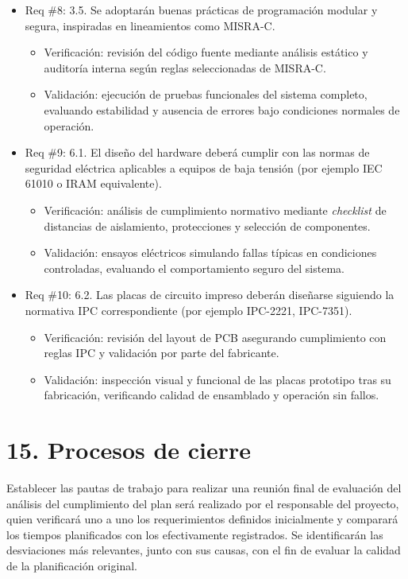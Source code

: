 \documentclass[
11pt, %
]{charter}
\begin{document}
\begin{itemize}
	\item Req \#8: 3.5. Se adoptarán buenas prácticas de programación modular y segura, inspiradas en lineamientos como MISRA-C.
	\begin{itemize}
		\item Verificación: revisión del código fuente mediante análisis estático y auditoría interna según reglas seleccionadas de MISRA-C.
		\item Validación: ejecución de pruebas funcionales del sistema completo, evaluando estabilidad y ausencia de errores bajo condiciones normales de operación.
	\end{itemize}
	
	\item Req \#9: 6.1. El diseño del hardware deberá cumplir con las normas de seguridad eléctrica aplicables a equipos de baja tensión (por ejemplo IEC 61010 o IRAM equivalente).
	\begin{itemize}
		\item Verificación: análisis de cumplimiento normativo mediante \textit{checklist} de distancias de aislamiento, protecciones y selección de componentes.
		\item Validación: ensayos eléctricos simulando fallas típicas en condiciones controladas, evaluando el comportamiento seguro del sistema.
	\end{itemize}
	
	\item Req \#10: 6.2. Las placas de circuito impreso deberán diseñarse siguiendo la normativa IPC correspondiente (por ejemplo IPC-2221, IPC-7351).
	\begin{itemize}
		\item Verificación: revisión del layout de PCB asegurando cumplimiento con reglas IPC y validación por parte del fabricante.
		\item Validación: inspección visual y funcional de las placas prototipo tras su fabricación, verificando calidad de ensamblado y operación sin fallos.
	\end{itemize}
\end{itemize}


\section{15. Procesos de cierre}    
\label{sec:cierre}

Establecer las pautas de trabajo para realizar una reunión final de evaluación del análisis del cumplimiento del plan será realizado por el responsable del proyecto, quien verificará uno a uno los requerimientos definidos inicialmente y comparará los tiempos planificados con los efectivamente registrados. Se identificarán las desviaciones más relevantes, junto con sus causas, con el fin de evaluar la calidad de la planificación original.
\end{document}
